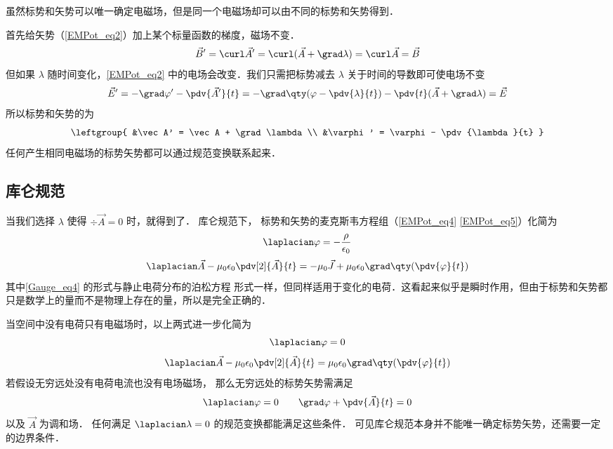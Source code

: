 
虽然标势和矢势可以唯一确定电磁场，但是同一个电磁场却可以由不同的标势和矢势得到．

首先给矢势（\autoref{EMPot_eq2}）加上某个标量函数的梯度，磁场不变．
\begin{equation}
\vec B' = \curl \vec A' = \curl (\vec A + \grad \lambda) = \curl \vec A = \vec B
\end{equation}
但如果 $\lambda$ 随时间变化，\autoref{EMPot_eq2} 中的电场会改变．我们只需把标势减去 $\lambda$ 关于时间的导数即可使电场不变
\begin{equation}
\vec E' = -\grad \varphi' - \pdv{\vec A'}{t} = -\grad \qty(\varphi - \pdv{\lambda}{t}) - \pdv{t} (\vec A + \grad \lambda) = \vec E
\end{equation}
所以标势和矢势的为
\begin{equation}\label{Gauge_eq3}
\leftgroup{
&\vec A' = \vec A + \grad \lambda\\
&\varphi' = \varphi - \pdv{\lambda}{t}
}\end{equation}
任何产生相同电磁场的标势矢势都可以通过规范变换联系起来．

\subsection{库仑规范}
当我们选择 $\lambda$ 使得 $\div \vec A = 0$ 时，就得到了． 库仑规范下， 标势和矢势的麦克斯韦方程组（\autoref{EMPot_eq4} \autoref{EMPot_eq5}）化简为
\begin{equation}\label{Gauge_eq4}
\laplacian \varphi = -\frac{\rho}{\epsilon_0}
\end{equation}
\begin{equation}
\laplacian \vec A - \mu_0\epsilon_0 \pdv[2]{\vec A}{t} = -\mu_0\vec J + \mu_0\epsilon_0 \grad\qty(\pdv{\varphi}{t})
\end{equation}
其中\autoref{Gauge_eq4} 的形式与静止电荷分布的泊松方程%
形式一样，但同样适用于变化的电荷．这看起来似乎是瞬时作用，但由于标势和矢势都只是数学上的量而不是物理上存在的量，所以是完全正确的．

当空间中没有电荷只有电磁场时，以上两式进一步化简为
\begin{equation}
\laplacian \varphi = 0
\end{equation}
\begin{equation}
\laplacian \vec A - \mu_0\epsilon_0 \pdv[2]{\vec A}{t} = \mu_0\epsilon_0 \grad\qty(\pdv{\varphi}{t})
\end{equation}
若假设无穷远处没有电荷电流也没有电场磁场， 那么无穷远处的标势矢势需满足
\begin{equation}
\laplacian \varphi = 0 \qquad
\grad \varphi + \pdv{\vec A}{t} = 0
\end{equation}
以及 $\vec A$ 为调和场． 任何满足 $\laplacian \lambda = 0$ 的规范变换都能满足这些条件． 可见库仑规范本身并不能唯一确定标势矢势，还需要一定的边界条件．


